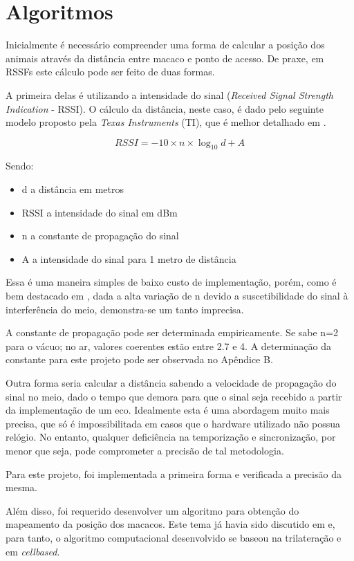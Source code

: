 \section{Algoritmos}
Inicialmente é necessário compreender uma forma de calcular a posição dos animais através da distância entre macaco e ponto de acesso. De praxe, em RSSFs este cálculo pode ser feito de duas formas.

A primeira delas é utilizando a intensidade do sinal (\emph{Received Signal Strength Indication} - RSSI). O cálculo da distância, neste caso, é dado pelo seguinte modelo proposto pela \emph{Texas Instruments} (TI), que é melhor detalhado em \cite{dong}.

\begin{equation}
RSSI = -10 \times n \times \log_{10} d + A
\end{equation}

Sendo:
\begin{itemize}
\item d a distância em metros
\item RSSI a intensidade do sinal em dBm
\item n a constante de propagação do sinal
\item A a intensidade do sinal para 1 metro de distância
\end{itemize}

Essa é uma maneira simples de baixo custo de implementação, porém, como é bem destacado em \cite{larsson}, dada a alta variação de n devido a suscetibilidade do sinal à interferência do meio, demonstra-se um tanto imprecisa.

A constante de propagação pode ser determinada empiricamente. Se sabe n=2 para o vácuo; no ar, valores coerentes estão entre 2.7 e 4. A determinação da constante para este projeto pode ser observada no Apêndice B.

Outra forma seria calcular a distância sabendo a velocidade de propagação do sinal no meio, dado o tempo que demora para que o sinal seja recebido a partir da implementação de um eco. Idealmente esta é uma abordagem muito mais precisa, que só é impossibilitada em casos que o hardware utilizado não possua relógio. No entanto, qualquer deficiência na temporização e sincronização, por menor que seja, pode comprometer a precisão de tal metodologia.

Para este projeto, foi implementada a primeira forma e verificada a precisão da mesma.

Além disso, foi requerido desenvolver um algoritmo para obtenção do mapeamento da posição dos macacos. Este tema já havia sido discutido em \cite{larissaamaralmiltonbiscaro} e, para tanto, o algoritmo computacional desenvolvido se baseou na trilateração e em \emph{cellbased}.

